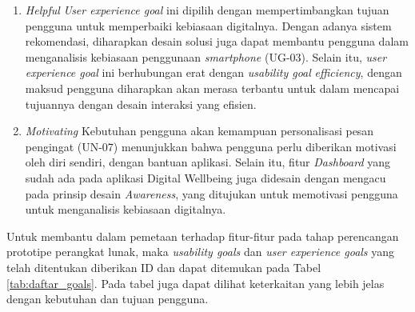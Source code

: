 \begin{enumerate}
  \item \textit{Helpful}
  \subitem \textit{User experience goal} ini dipilih dengan mempertimbangkan tujuan pengguna untuk memperbaiki kebiasaan digitalnya. Dengan adanya sistem rekomendasi, diharapkan desain solusi juga dapat membantu pengguna dalam menganalisis kebiasaan penggunaan \textit{smartphone} (UG-03). Selain itu, \textit{user experience goal} ini berhubungan erat dengan \textit{usability goal} \textit{efficiency}, dengan maksud pengguna diharapkan akan merasa terbantu untuk dalam mencapai tujuannya dengan desain interaksi yang efisien.

  \item \textit{Motivating}
  \subitem Kebutuhan pengguna akan kemampuan personalisasi pesan pengingat (UN-07) menunjukkan bahwa pengguna perlu diberikan motivasi oleh diri sendiri, dengan bantuan aplikasi. Selain itu, fitur \textit{Dashboard} yang sudah ada pada aplikasi Digital Wellbeing juga didesain dengan mengacu pada prinsip desain \textit{Awareness}, yang ditujukan untuk memotivasi pengguna untuk menganalisis kebiasaan digitalnya.

\end{enumerate}

Untuk membantu dalam pemetaan terhadap fitur-fitur pada tahap perencangan prototipe perangkat lunak, maka \textit{usability goals} dan \textit{user experience goals} yang telah ditentukan diberikan ID dan dapat ditemukan pada Tabel \ref{tab:daftar_goals}. Pada tabel juga dapat dilihat keterkaitan yang lebih jelas dengan kebutuhan dan tujuan pengguna.

